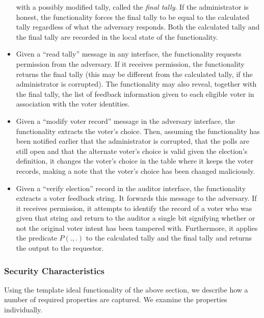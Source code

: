 \begin{itemize}
  with a possibly modified tally, called the {\em final tally}. If the
  administrator is honest, the functionality forces the final tally to
  be equal to the calculated tally regardless of what the adversary
  responds. Both the calculated tally and the final tally are recorded
  in the local state of the functionality.
\item Given a ``read tally'' message in any interface, the
  functionality requests permission from the adversary. If it receives
  permission, the functionality returns the final tally (this may be
  different from the calculated tally, if the administrator is
  corrupted). The functionality may also reveal, together with the
  final tally, the list of feedback information given to each eligible
  voter in association with the voter identities.
\item Given a ``modify voter record'' message in the adversary
  interface, the functionality extracts the voter's choice. Then,
  assuming the functionality has been notified earlier that the
  administrator is corrupted, that the polls are still open and that
  the alternate voter's choice is valid given the election's
  definition, it changes the voter's choice in the table where it
  keeps the voter records, making a note that the voter's choice has
  been changed maliciously.
\item Given a ``verify election'' record in the auditor interface, the
  functionality extracts a voter feedback string. It forwards this
  message to the adversary. If it receives permission, it attempts to
  identify the record of a voter who was given that string and return
  to the auditor a single bit signifying whether or not the original
  voter intent has been tampered with. Furthermore, it applies the
  predicate $P(.,.)$ to the calculated tally and the final tally and
  returns the output to the requestor. 
\end{itemize}

\subsubsection{Security Characteristics}

Using the template ideal functionality of the above section, we
describe how a number of required properties are captured. We examine
the properties individually.

